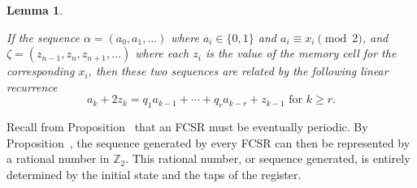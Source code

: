 \documentclass[english]{article}
\def\zzz{\mathbb{Z}}
\theoremstyle{plain}
\newtheorem{lemma}[theorem]{Lemma}%
\theoremstyle{definition}
\theoremstyle{remark}
\begin{document}
\begin{lemma}\label{lem:linear-recur}
\par If the sequence $\alpha=(a_0,a_1,\dots)$ where $a_i\in\{0,1\}$ and
$a_i\equiv x_i\pmod2$, and $\zeta=(z_{n-1},z_n,z_{n+1},\dots)$ where each
$z_i$ is the value of the memory cell for the corresponding $x_i$, then
these two sequences are related by the following linear recurrence
\begin{equation}\label{eqn:lin-rec}
  a_k+2z_k=q_1a_{k-1}+\cdots+q_ra_{k-r}+z_{k-1} \text{ for } k\geq r.
\end{equation}
\end{lemma}

\par Recall from Proposition~\label{prop:golomb-2} that an FCSR must be
eventually periodic. By Proposition~\label{prop:rational-periodic}, the sequence
generated by every FCSR can then be represented by a rational number in
$\zzz_2$. This rational number, or sequence generated, is entirely determined by
the initial state and the taps of the register.
\end{document}

